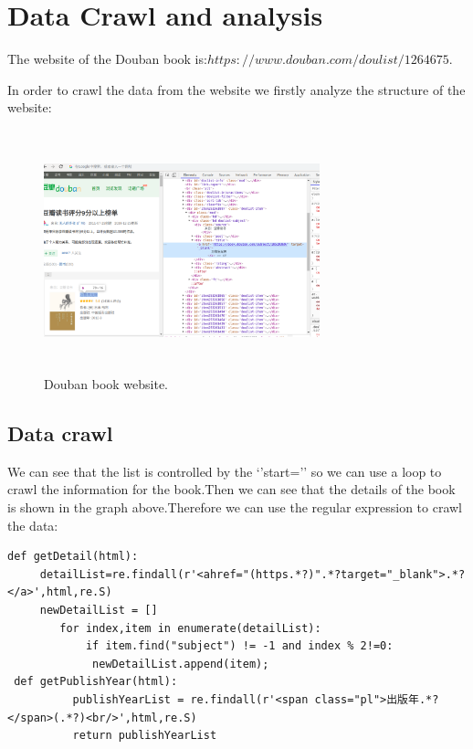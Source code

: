 \documentclass[12pt, a4paper]{article}
\begin{document}
    \section{Data Crawl and analysis}
       
    The website of the Douban book is:\small $ https://www.douban.com/doulist/1264675$.\

In order to crawl the data from the website 
we firstly analyze the structure of the website:


\begin{figure}[ht]
    \centering
    \includegraphics[width=8cm,height=7cm]{p1.png}
    \caption{Douban book website.}
\end{figure}


   \subsection{Data crawl}
   We can see that the list is controlled by the ‘’start={}’’ so we can use a 
   loop to crawl the information for the book.Then we can see that the details of 
   the book is shown in the graph above.Therefore we can use the regular expression 
   to crawl the data\cite{mitchell2018web}: 


\lstset{language=Python}
\begin{lstlisting}[caption={Data crawl}]
def getDetail(html):
     detailList=re.findall(r'<ahref="(https.*?)".*?target="_blank">.*?</a>',html,re.S)
     newDetailList = []
        for index,item in enumerate(detailList):
            if item.find("subject") != -1 and index % 2!=0:
             newDetailList.append(item);
 def getPublishYear(html):
          publishYearList = re.findall(r'<span class="pl">出版年.*?</span>(.*?)<br/>',html,re.S)
          return publishYearList
 \end{lstlisting}
 　　　　　　　　　　　　　　　　　　　　　　　　　　　　　　　　　　　　　　　　　　　　　　　　　　　　　　　　　　　　　　　　　　　　　　　　　　　　　　　　　　　　　　　　　　　　　　　　　　　　　　　　　　　　　　　　　　　　　　　　　　　　　　　　　　　　　　　　　　　　　　　　　　　　　　　　　　　　　　　　　　　　　　　　　　　　　　　　　　　　　　　　　　　　　　　  
   
\end{document}
